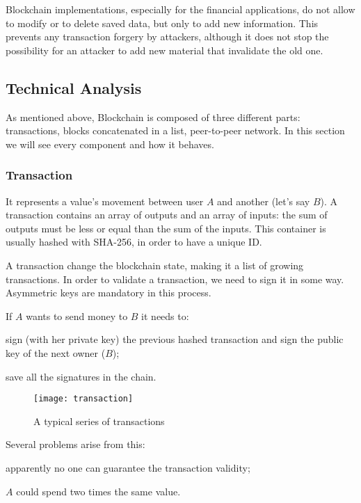 Blockchain implementations, especially for the financial applications, do not
allow to modify or to delete saved data, but only to add new information. This
prevents any transaction forgery by attackers, although it does not stop the
possibility for an attacker to add new material that invalidate the old one.

\subsection{Technical Analysis}

As mentioned above, Blockchain is composed of three different
parts\cite{sok15}: transactions, blocks concatenated in a list, peer-to-peer
network. In this section we will see every component and how it behaves.

\subsubsection{Transaction}
It represents a value's movement between user $A$ and another (let's
say $B$). A transaction contains an array of outputs and an array of
inputs\cite{sok15}: the sum of outputs must be less or equal than the sum of
the inputs.
This container is usually hashed with SHA-256, in order to have a
unique ID.

A transaction change the blockchain state, making it a list of growing
transactions.
In order to validate a transaction, we need to sign it in some way. Asymmetric
keys are mandatory in this process.

If $A$ wants to send money to $B$ it needs to:
\begin{enumerate*}[label=\roman*)]
 \item sign (with her private key) the previous hashed transaction and sign the
public key of the next owner ($B$);
 \item save all the signatures in the chain.
\end{enumerate*}

\begin{figure}[ht]
 \centering
 \texttt{[image: transaction]}
 \caption{A typical series of transactions}
\end{figure}

Several problems arise from this:
\begin{enumerate*}[label=\roman*)]
 \item apparently no one can guarantee the transaction validity;
 \item $A$ could spend two times the same value.
\end{enumerate*}

